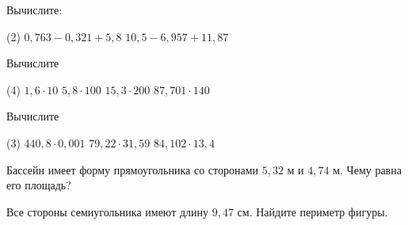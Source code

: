 \begin{homework}[number=4]
	\begin{listofex}
		\item Вычислите:
		\begin{tasks}(2)
			\task \( 0,763-0,321+5,8 \)
			\task \( 10,5-6,957+11,87 \)
		\end{tasks}
		\item Вычислите 
		\begin{tasks}(4)
			\task \( 1,6\cdot10 \)
			\task \( 5,8\cdot100 \)
			\task \( 15,3\cdot200 \)
			\task \( 87,701\cdot 140 \)
		\end{tasks}
		\item Вычислите 
		\begin{tasks}(3)
			\task \( 440,8\cdot0,001 \)
			\task \( 79,22\cdot31,59 \)
			\task \( 84,102\cdot13,4 \)
		\end{tasks}
		\item Бассейн имеет форму прямоугольника со сторонами \( 5,32 \) м и \( 4,74 \) м. Чему равна его площадь?
		\item Все стороны семиугольника имеют длину \( 9,47 \) см. Найдите периметр фигуры.
	\end{listofex}
\end{homework}
